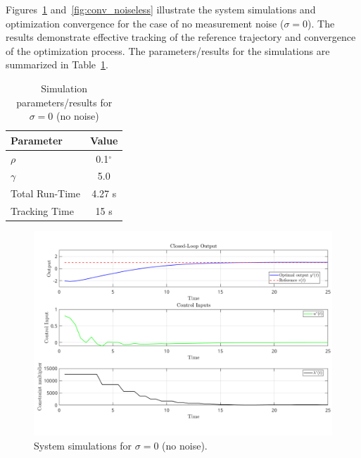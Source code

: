 Figures~\ref{fig:ddpc_noiseless} and~\ref{fig:conv_noiseless} illustrate the system simulations and optimization convergence for the case of no measurement noise ($\sigma = 0$). The results demonstrate effective tracking of the reference trajectory and convergence of the optimization process. The parameters/results for the simulations are summarized in Table~\ref{tab:ddpc_params_double_integrator}.
\begin{table}[h]
    \centering
    \begin{tabular}{l|c}
        \textbf{Parameter} & \textbf{Value} \\
        \hline 
        \hline
        $\rho$ & 0.1$^\circ$ \\
        $\gamma$ & 5.0 \\
        Total Run-Time & 4.27 s \\
        Tracking Time & 15 s \\
        \hline
    \end{tabular}
    \caption{Simulation parameters/results for $\sigma=0$ (no noise)}
    \label{tab:ddpc_params_double_integrator}
\end{table}
\begin{figure}[h]
    \centering
    \includegraphics[trim={0cm 1cm 0cm 0cm},clip,width=\textwidth]{figures/closed_loop_noiseless_gamma_5_rho_0p1.png}
    \caption{System simulations for $\sigma = 0$ (no noise).}\label{fig:ddpc_noiseless}
\end{figure}


